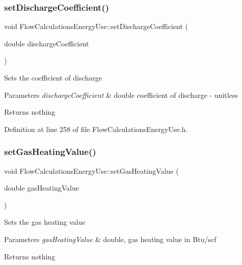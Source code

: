 \subsubsection{\texorpdfstring{set\+Discharge\+Coefficient()}{setDischargeCoefficient()}\hspace{0.1cm}{\footnotesize\ttfamily [3/3]}}
{\footnotesize\ttfamily void Flow\+Calculations\+Energy\+Use\+::set\+Discharge\+Coefficient (\begin{DoxyParamCaption}\item[{double}]{discharge\+Coefficient }\end{DoxyParamCaption})\hspace{0.3cm}{\ttfamily [inline]}}

Sets the coefficient of discharge


\begin{DoxyParams}{Parameters}
{\em discharge\+Coefficient} & double coefficient of discharge -\/ unitless\\
\hline
\end{DoxyParams}
\begin{DoxyReturn}{Returns}
nothing 
\end{DoxyReturn}


Definition at line 258 of file Flow\+Calculations\+Energy\+Use.\+h.

\mbox{\label{class_flow_calculations_energy_use_ae51a954fb1f44d6b114f66e69bdf754e}} 
\subsubsection{\texorpdfstring{set\+Gas\+Heating\+Value()}{setGasHeatingValue()}\hspace{0.1cm}{\footnotesize\ttfamily [1/3]}}
{\footnotesize\ttfamily void Flow\+Calculations\+Energy\+Use\+::set\+Gas\+Heating\+Value (\begin{DoxyParamCaption}\item[{double}]{gas\+Heating\+Value }\end{DoxyParamCaption})\hspace{0.3cm}{\ttfamily [inline]}}

Sets the gas heating value


\begin{DoxyParams}{Parameters}
{\em gas\+Heating\+Value} & double, gas heating value in Btu/scf\\
\hline
\end{DoxyParams}
\begin{DoxyReturn}{Returns}
nothing 
\end{DoxyReturn}


